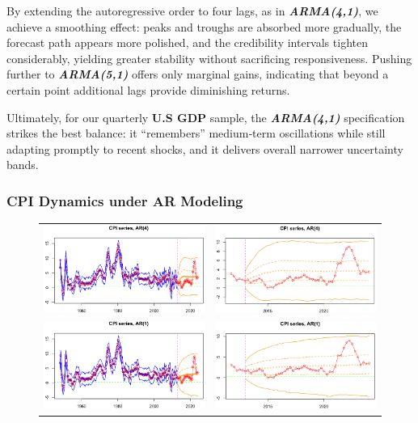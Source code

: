 \documentclass{Configuration_Files/PoliMi3i_thesis}
\begin{document}
By extending the autoregressive order to four lags, as in \textbf{\textit{ARMA(4,1)}}, we achieve a smoothing effect: peaks and troughs are absorbed more gradually, the forecast path appears more polished, and the credibility intervals tighten considerably, yielding greater stability without sacrificing responsiveness. Pushing further to \textbf{\textit{ARMA(5,1)}} offers only marginal gains, indicating that beyond a certain point additional lags provide diminishing returns. 

Ultimately, for our quarterly \textbf{U.S GDP} sample, the \textbf{\textit{ARMA(4,1)}} specification strikes the best balance: it “remembers” medium‐term oscillations while still adapting promptly to recent shocks, and it delivers overall narrower uncertainty bands.  

\subsubsection{CPI Dynamics under AR Modeling}
\begin{figure}[H]
  \centering
  \begin{tabular}{@{}cc@{}}
    \includegraphics[angle=90,width=0.33\linewidth]{CPI_FAR(4).png} &
    \includegraphics[angle=90,width=0.33\linewidth]{CPI_ZAR(4).png} \\
    \includegraphics[angle=90,width=0.33\linewidth]{CPI_FAR(1).png} &
    \includegraphics[angle=90,width=0.335\linewidth]{CPI_ZAR(1).png}
  \end{tabular}
\end{figure}
\end{document}
